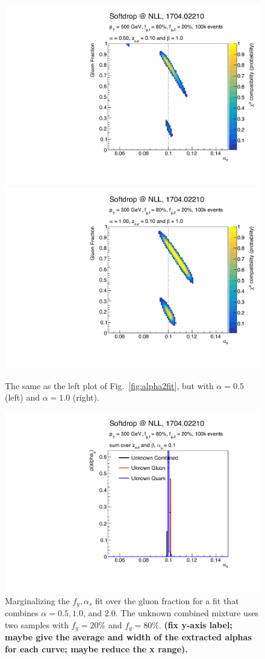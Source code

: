 \begin{figure}[h!]
\begin{center}
\includegraphics[width = 0.49\columnwidth]{figures/banana_alpha_0_50beta_1_00_zcut_0_10.pdf}\includegraphics[width = 0.49\columnwidth]{figures/banana_alpha_1_00beta_1_00_zcut_0_10.pdf}
\end{center}
\caption{The same as the left plot of Fig.~\ref{fig:alpha2fit}, but with $\alpha=0.5$ (left) and $\alpha=1.0$ (right).}
\label{fig:morebananas}
\end{figure}

\begin{figure}[h!]
\begin{center}
\includegraphics[width = 0.49\columnwidth]{figures/combination.pdf}
\end{center}
\caption{Marginalizing the $f_g,\alpha_s$ fit over the gluon fraction for a fit that combines $\alpha=0.5, 1.0$, and $2.0$.  The unknown combined mixture uses two samples with $f_g=20\%$ and $f_g=80\%$. \textbf{(fix y-axis label; maybe give the average and width of the extracted alphas for each curve; maybe reduce the x range).}}
\label{fig:combo}
\end{figure}

